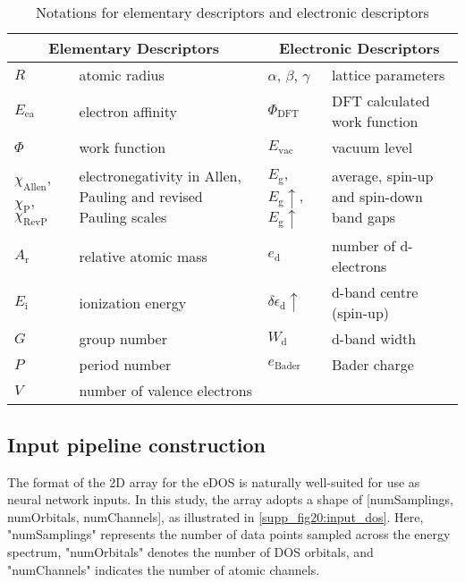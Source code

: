 \begin{table}[htbp]
  \centering
  \begin{tabular}{lp{5cm}lp{5cm}}
    \toprule
    \multicolumn{2}{c}{Elementary Descriptors}       & \multicolumn{2}{c}{Electronic Descriptors}            \\
    \midrule
    $R$            & atomic radius                   & $\alpha$, $\beta$, $\gamma$  & lattice parameters     \\
    $E_\text{ea}$  & electron affinity               & $\Phi_{\text{DFT}}$    & DFT calculated work function \\
    $\Phi$         & work function                   & $E_\text{vac}$         & vacuum level                 \\
    $\chi_\text{Allen}$, $\chi_\text{P}$, $\chi_\text{RevP}$
    & \parbox[t]{4cm}{electronegativity in Allen, Pauling and revised Pauling scales}
    & $E_\text{g}$, $E_\text{g}\uparrow$, $E_\text{g}\uparrow$
    & \parbox[t]{4cm}{average, spin-up and spin-down band gaps}                                              \\
    $A_\text{r}$   & relative atomic mass            & $e_\text{d}$           & number of d-electrons        \\
    $E_\text{i}$   & ionization energy & $\delta\epsilon_{\text{d}}\uparrow$  & d-band centre (spin-up)      \\
    $G$            & group number                    & $W_\text{d}$           & d-band width                 \\
    $P$            & period number                   & $e_{\text{Bader}}$     & Bader charge                 \\
    $V$            & number of valence electrons     &                        &                              \\
    \bottomrule
  \end{tabular}
  \caption{Notations for elementary descriptors and electronic descriptors}
  \label{supp_table15:descriptor_notations}
\end{table}

\subsection{Input pipeline construction}
\label{supp_sec3.3_input_pipeline}

The format of the 2D array for the eDOS is naturally well-suited for use as neural network inputs.
In this study, the array adopts a shape of [numSamplings, numOrbitals, numChannels], as illustrated in \cref{supp_fig20:input_dos}.
Here, "numSamplings" represents the number of data points sampled across the energy spectrum,
"numOrbitals" denotes the number of DOS orbitals,
and "numChannels" indicates the number of atomic channels.

